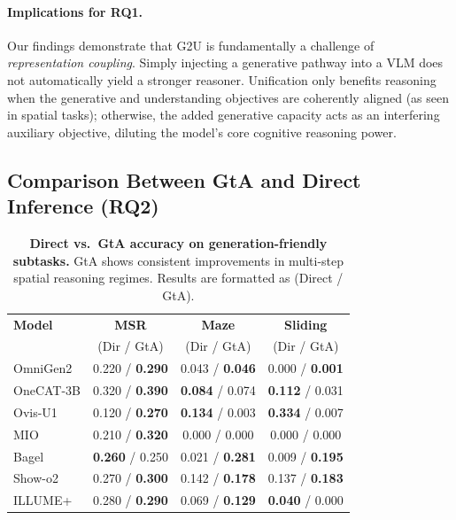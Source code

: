 \documentclass{article}
\theoremstyle{plain}
\theoremstyle{definition}
\theoremstyle{remark}
\begin{document}
\paragraph{Implications for RQ1.}
Our findings demonstrate that G2U is fundamentally a challenge of \emph{representation coupling}. Simply injecting a generative pathway into a VLM does not automatically yield a stronger reasoner. Unification only benefits reasoning when the generative and understanding objectives are coherently aligned (as seen in spatial tasks); otherwise, the added generative capacity acts as an interfering auxiliary objective, diluting the model's core cognitive reasoning power.

\subsection{Comparison Between GtA and Direct Inference (RQ2)}
\label{sec:rq2}

\begin{table}[ht]
\centering
\caption{\textbf{Direct vs.\ GtA accuracy on generation-friendly subtasks.} GtA shows consistent improvements in multi-step spatial reasoning regimes. Results are formatted as (Direct / GtA).}
\label{tab:rq2_spatial_subtasks}
\small
\begin{tabular}{@{}lccc@{}}
\toprule
\textbf{Model} & \textbf{MSR} & \textbf{Maze} & \textbf{Sliding} \\
& (Dir / GtA) & (Dir / GtA) & (Dir / GtA) \\
\midrule
OmniGen2 & 0.220 / \textbf{0.290} & 0.043 / \textbf{0.046} & 0.000 / \textbf{0.001} \\
OneCAT-3B & 0.320 / \textbf{0.390} & \textbf{0.084} / 0.074 & \textbf{0.112} / 0.031 \\
Ovis-U1 & 0.120 / \textbf{0.270} & \textbf{0.134} / 0.003 & \textbf{0.334} / 0.007 \\
MIO & 0.210 / \textbf{0.320} & 0.000 / 0.000 & 0.000 / 0.000 \\
Bagel & \textbf{0.260} / 0.250 & 0.021 / \textbf{0.281} & 0.009 / \textbf{0.195} \\
Show-o2 & 0.270 / \textbf{0.300} & 0.142 / \textbf{0.178} & 0.137 / \textbf{0.183} \\
ILLUME+ & 0.280 / \textbf{0.290} & 0.069 / \textbf{0.129} & \textbf{0.040} / 0.000 \\
\bottomrule
\end{tabular}
\end{table}
\end{document}
